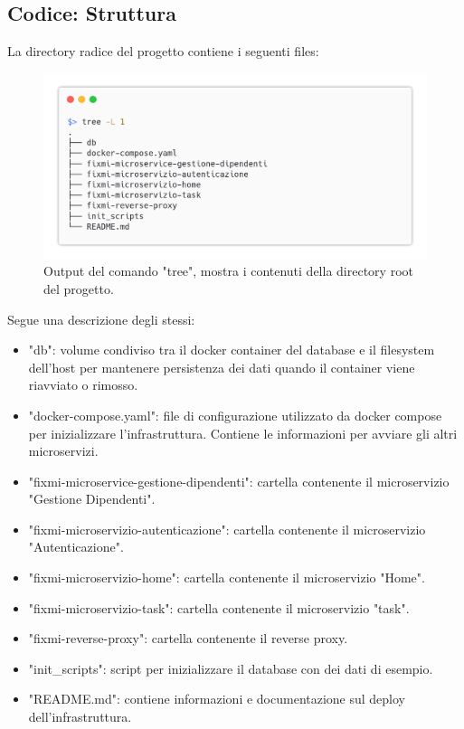 \documentclass{report}
\begin{document}
\subsection*{Codice: Struttura}

La directory radice del progetto contiene i seguenti files:

\begin{figure}[H]
	\centering\includegraphics[width=1\textwidth]{images/tree.png}
	Output del comando "tree", mostra i contenuti della directory root del progetto.
\end{figure}

Segue una descrizione degli stessi:
\begin{itemize}
	\item "db": volume condiviso tra il docker container del database e il filesystem dell'host per mantenere persistenza dei dati quando il container viene riavviato o rimosso.
	\item "docker-compose.yaml": file di configurazione utilizzato da docker compose per inizializzare l'infrastruttura. Contiene le informazioni per avviare gli altri microservizi.
	\item "fixmi-microservice-gestione-dipendenti": cartella contenente il microservizio "Gestione Dipendenti".
	\item "fixmi-microservizio-autenticazione": cartella contenente il microservizio "Autenticazione".
	\item "fixmi-microservizio-home": cartella contenente il microservizio "Home".
	\item "fixmi-microservizio-task": cartella contenente il microservizio "task".
	\item "fixmi-reverse-proxy": cartella contenente il reverse proxy.
	\item "init\_scripts": script per inizializzare il database con dei dati di esempio.
	\item "README.md": contiene informazioni e documentazione sul deploy dell'infrastruttura.
\end{itemize}
\end{document}
